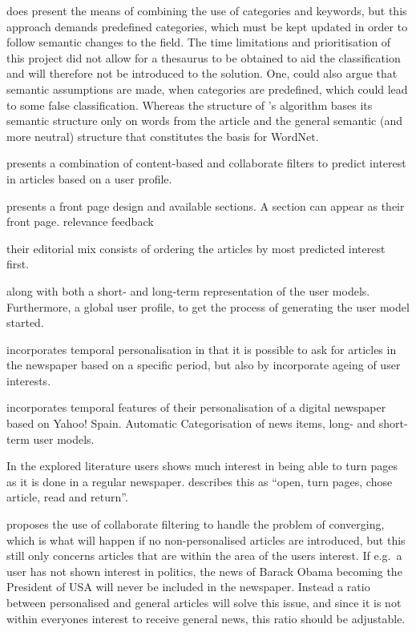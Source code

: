 \cite{fulltext.pdf} does present the means of combining the use of categories and keywords, but this approach demands predefined categories, which must be kept updated in order to follow semantic changes to the field. The time limitations and prioritisation of this project did not allow for a thesaurus to be obtained to aid the classification and will therefore not be introduced to the solution. One, could also argue that semantic assumptions are made, when categories are predefined, which could lead to some false classification. Whereas the structure of \cite{116262780379.pdf}'s algorithm bases its semantic structure only on words from the article and the general semantic (and more neutral) structure that constitutes the basis for WordNet.

\cite{10.1.1.45.5230.pdf} presents a combination of content-based and collaborate filters to predict interest in articles based on a user profile.

\cite{10.1.1.45.5230.pdf} presents a front page design and available sections. A section can appear as their front page.
relevance feedback

their editorial mix consists of ordering the articles by most predicted interest first.

\cite{fulltext.pdf} along with both a short- and long-term representation of the user models. Furthermore, a global user profile, to get the process of generating the user model started.

\cite{Personalizing-your-electronic-newspaper.pdf} incorporates temporal personalisation in that it is possible to ask for articles in the newspaper based on a specific period, but also by incorporate ageing of user interests.

\cite{Estebanetal.pdf} incorporates temporal features of their personalisation of a digital newspaper based on Yahoo! Spain. Automatic Categorisation of news items, long- and short-term user models.

In the explored literature users shows much interest in being able to turn pages as it is done in a regular newspaper. \cite{FULLTEXT01.pdf} describes this as ``open, turn pages, chose article, read and return''.

\cite{fulltext.pdf} proposes the use of collaborate filtering to handle the problem of converging, which is what will happen if no non-personalised articles are introduced, but this still only concerns articles that are within the area of the users interest. If e.g.\ a user has not shown interest in politics, the news of Barack Obama becoming the President of USA will never be included in the newspaper. Instead a ratio between personalised and general articles will solve this issue, and since it is not within everyones interest to receive general news, this ratio should be adjustable.

